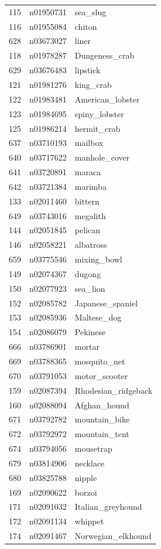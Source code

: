 \begin{table}
\begin{tabular}{cll}
115 & n01950731 & sea_slug \\
116 & n01955084 & chiton \\
628 & n03673027 & liner \\
118 & n01978287 & Dungeness_crab \\
629 & n03676483 & lipstick \\
121 & n01981276 & king_crab \\
122 & n01983481 & American_lobster \\
123 & n01984695 & spiny_lobster \\
125 & n01986214 & hermit_crab \\
637 & n03710193 & mailbox \\
640 & n03717622 & manhole_cover \\
641 & n03720891 & maraca \\
642 & n03721384 & marimba \\
133 & n02011460 & bittern \\
649 & n03743016 & megalith \\
144 & n02051845 & pelican \\
146 & n02058221 & albatross \\
659 & n03775546 & mixing_bowl \\
149 & n02074367 & dugong \\
150 & n02077923 & sea_lion \\
152 & n02085782 & Japanese_spaniel \\
153 & n02085936 & Maltese_dog \\
154 & n02086079 & Pekinese \\
666 & n03786901 & mortar \\
669 & n03788365 & mosquito_net \\
670 & n03791053 & motor_scooter \\
159 & n02087394 & Rhodesian_ridgeback \\
160 & n02088094 & Afghan_hound \\
671 & n03792782 & mountain_bike \\
672 & n03792972 & mountain_tent \\
674 & n03794056 & mousetrap \\
679 & n03814906 & necklace \\
680 & n03825788 & nipple \\
169 & n02090622 & borzoi \\
171 & n02091032 & Italian_greyhound \\
172 & n02091134 & whippet \\
174 & n02091467 & Norwegian_elkhound \\

\end{tabular}
\end{table}
